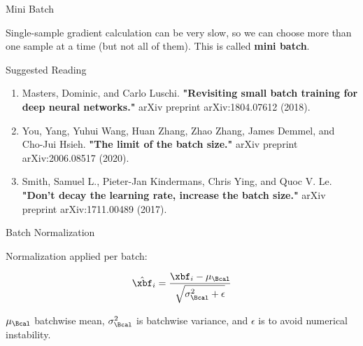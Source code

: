 \documentclass[aspectratio=169,xcolor=dvipsnames,svgnames,x11names,fleqn]{beamer}
\begin{document}
\begin{frame}{Mini Batch}
    
    Single-sample gradient calculation can be very slow, so we can choose more than one sample at a time (but not all of them). This is called \textbf{mini batch}.

\end{frame}

\begin{frame}{Suggested Reading}

    \large 
    \begin{enumerate}
        \item Masters, Dominic, and Carlo Luschi. \textbf{"Revisiting small batch training for deep neural networks."} arXiv preprint arXiv:1804.07612 (2018).
        \item You, Yang, Yuhui Wang, Huan Zhang, Zhao Zhang, James Demmel, and Cho-Jui Hsieh. \textbf{"The limit of the batch size."} arXiv preprint arXiv:2006.08517 (2020).
        \item Smith, Samuel L., Pieter-Jan Kindermans, Chris Ying, and Quoc V. Le. \textbf{"Don't decay the learning rate, increase the batch size."} arXiv preprint arXiv:1711.00489 (2017).
    \end{enumerate}
    
\end{frame}

\begin{frame}{Batch Normalization}

    Normalization applied per batch:

    \begin{align*}
        \hat{\xbf}_i = \frac{\xbf_i - \mu_{\Bcal}}{\sqrt{\sigma^2_\Bcal + \epsilon}}
    \end{align*}
    
    $ \mu_{\Bcal}$ batchwise mean, $\sigma^2_\Bcal$ is batchwise variance, and $\epsilon$ is to avoid numerical instability.
\end{frame}
\end{document}
